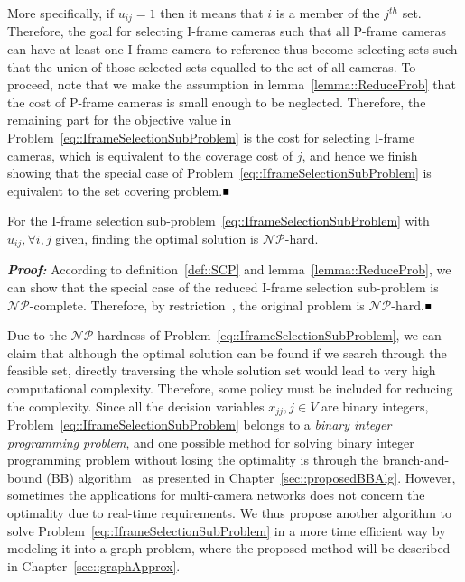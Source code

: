 More specifically, if $u_{ij} = 1$ then it means that $i$ is a member of the $j^{th}$ set.
Therefore, the goal for selecting I-frame cameras such that all P-frame cameras can have at least one I-frame camera to reference thus become selecting sets such that the union of those selected sets equalled to the set of all cameras.
To proceed, note that we make the assumption in lemma~\ref{lemma::ReduceProb} that the cost of P-frame cameras is small enough to be neglected.
Therefore, the remaining part for the objective value in Problem~\eqref{eq::IframeSelectionSubProblem} is the cost for selecting I-frame cameras, which is equivalent to the coverage cost of $j$, and hence we finish showing that the special case of Problem~\eqref{eq::IframeSelectionSubProblem} is equivalent to the set covering problem.\hfill$\mathsmaller{\mathsmaller{\blacksquare}}$

\begin{mythm}
For the I-frame selection sub-problem~\eqref{eq::IframeSelectionSubProblem} with $u_{ij}, \forall i,j$ given, finding the optimal solution is $\mathcal{NP}$-hard.
\end{mythm}
\textbf{\emph{Proof:}}
According to definition~\ref{def::SCP} and lemma~\ref{lemma::ReduceProb}, we can show that the special case of the reduced I-frame selection sub-problem is $\mathcal{NP}$-complete.
Therefore, by restriction~\cite{Restriction}, the original problem is $\mathcal{NP}$-hard.\hfill$\mathsmaller{\mathsmaller{\blacksquare}}$

Due to the $\mathcal{NP}$-hardness of Problem~\eqref{eq::IframeSelectionSubProblem}, we can claim that although the optimal solution can be found if we search through the feasible set, directly traversing the whole solution set would lead to very high computational complexity.
Therefore, some policy must be included for reducing the complexity.
Since all the decision variables ${x_{jj},j \in V}$ are binary integers, Problem~\eqref{eq::IframeSelectionSubProblem} belongs to a \emph{binary integer programming problem}, and one possible method for solving binary integer programming problem without losing the optimality is through the branch-and-bound (BB) algorithm~\cite{BB} as presented in Chapter~\ref{sec::proposedBBAlg}.
However, sometimes the applications for multi-camera networks does not concern the optimality due to real-time requirements.
We thus propose another algorithm to solve Problem~\eqref{eq::IframeSelectionSubProblem} in a more time efficient way by modeling it into a graph problem, where the proposed method will be described in Chapter~\ref{sec::graphApprox}.
%
